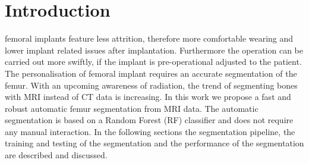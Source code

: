 \section{Introduction}
 femoral implants feature less attrition, therefore more comfortable wearing and lower implant related issues after implantation. Furthermore the operation can be carried out more swiftly, if the implant is pre-operational adjusted to the patient. The personalisation of femoral implant requires an accurate segmentation of the femur. With an upcoming awareness of radiation, the trend of segmenting bones with MRI instead of CT data is increasing.
In this work we propose a fast and robust automatic femur segmentation from MRI data. The automatic segmentation is based on a Random Forest (RF) classifier and does not require any manual interaction. In the following sections the segmentation pipeline, the training and testing of the segmentation and the performance of the segmentation are described and discussed.

